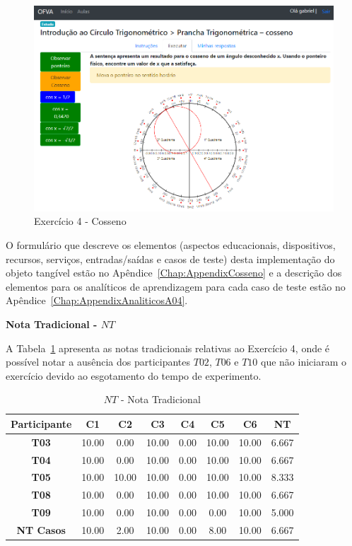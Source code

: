 \begin{figure}[!htb]
	\centering
	\includegraphics[width=0.9\linewidth]{chapters/results/Fase 3/E4_Virtual.png}
	\caption{Exercício 4 - Cosseno}
	\label{fig:E4}
\end{figure}

O formulário que descreve os elementos (aspectos educacionais, dispositivos, recursos, serviços, entradas/saídas e casos de teste) desta implementação do objeto tangível estão no Apêndice~\ref{Chap:AppendixCosseno} e a descrição dos elementos para os analíticos de aprendizagem para cada caso de teste estão no Apêndice~\ref{Chap:AppendixAnaliticosA04}.

\textbf{Nota Tradicional - $NT$}

A Tabela~\ref{tab:F3_A4_NT} apresenta as notas tradicionais relativas ao Exercício 4, onde é possível notar a ausência dos participantes $T02$, $T06$ e $T10$ que não iniciaram o exercício devido ao esgotamento do tempo de experimento.

\begin{table}[htbp]
	\centering
	\caption{$NT$ - Nota Tradicional}
	\begin{tabular}{|c|c|c|c|c|c|c|c|}
		\hline
		\rowcolor[HTML]{D9D9D9} 
		\textbf{Participante} & \textbf{C1} & \textbf{C2} & \textbf{C3} & \textbf{C4} & \textbf{C5} & \textbf{C6} & \textbf{NT} \\ \hline
		\rowcolor[HTML]{FFFFFF} 
		\textbf{T03} & 10.00 & 0.00 & 10.00 & 0.00 & 10.00 & 10.00 & 6.667 \\ \hline
		\rowcolor[HTML]{E7E6E6} 
		\textbf{T04} & 10.00 & 0.00 & 10.00 & 0.00 & 10.00 & 10.00 & 6.667 \\ \hline
		\rowcolor[HTML]{FFFFFF} 
		\textbf{T05} & 10.00 & 10.00 & 10.00 & 0.00 & 10.00 & 10.00 & 8.333 \\ \hline
		\rowcolor[HTML]{E7E6E6} 
		\textbf{T08} & 10.00 & 0.00 & 10.00 & 0.00 & 10.00 & 10.00 & 6.667 \\ \hline
		\rowcolor[HTML]{FFFFFF} 
		\textbf{T09} & 10.00 & 0.00 & 10.00 & 0.00 & 0.00 & 10.00 & 5.000 \\ \hline
		\rowcolor[HTML]{D9D9D9} 
		\textbf{NT Casos} & 10.00 & 2.00 & 10.00 & 0.00 & 8.00 & 10.00 & 6.667 \\ \hline
	\end{tabular}
	\label{tab:F3_A4_NT}
\end{table}

